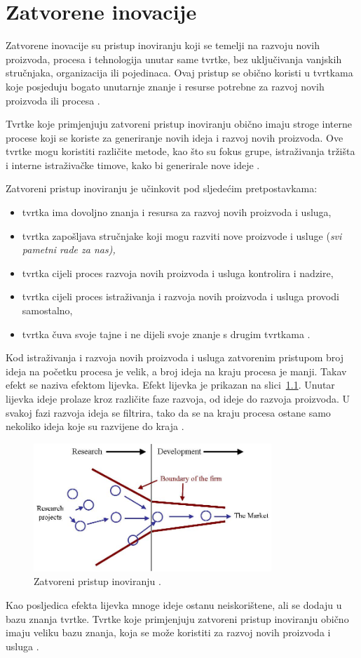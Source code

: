 \chapter{Zatvorene inovacije}

Zatvorene inovacije su pristup inoviranju koji se temelji na razvoju novih
proizvoda, procesa i tehnologija unutar same tvrtke, bez uključivanja vanjskih
stručnjaka, organizacija ili pojedinaca. Ovaj pristup se obično koristi u
tvrtkama koje posjeduju bogato unutarnje znanje i resurse potrebne za razvoj
novih proizvoda ili procesa \citep{zatvorenaotvorena2020}.

Tvrtke koje primjenjuju zatvoreni pristup inoviranju obično imaju stroge interne
procese koji se koriste za generiranje novih ideja i razvoj novih proizvoda. Ove
tvrtke mogu koristiti različite metode, kao što su fokus grupe, istraživanja
tržišta i interne istraživačke timove, kako bi generirale nove ideje \citep{zatvorenaotvorena2020}.

Zatvoreni pristup inoviranju je učinkovit pod sljedećim pretpostavkama:
\begin{itemize}
    \item tvrtka ima dovoljno znanja i resursa za razvoj novih proizvoda i usluga,
    \item tvrtka zapošljava stručnjake koji mogu razviti nove proizvode i usluge (\it{svi pametni rade za nas}),
    \item tvrtka cijeli proces razvoja novih proizvoda i usluga kontrolira i nadzire,
    \item tvrtka cijeli proces istraživanja i razvoja novih proizvoda i usluga provodi samostalno,
    \item tvrtka čuva svoje tajne i ne dijeli svoje znanje s drugim tvrtkama \citep{zatvorenaotvorena2020}.
\end{itemize}

Kod istraživanja i razvoja novih proizvoda i usluga zatvorenim pristupom broj ideja
na početku procesa je velik, a broj ideja na kraju procesa je manji. Takav efekt
se naziva efektom lijevka. Efekt lijevka je prikazan na slici~\ref{fig:closed_inovations_funnel}.
Unutar lijevka ideje prolaze kroz različite faze razvoja, od ideje do
razvoja proizvoda. U svakoj fazi razvoja ideja se filtrira, tako da se na kraju
procesa ostane samo nekoliko ideja koje su razvijene do kraja \citep{zatvorenaotvorena2020}.

\begin{figure} 
    \centering
    \includegraphics[width=0.8\textwidth]{images/closed_inovations_funnel.jpg}
    \caption{Zatvoreni pristup inoviranju \citep{openinnovation2016}.}\label{fig:closed_inovations_funnel}
\end{figure}

Kao posljedica efekta lijevka mnoge ideje ostanu neiskorištene, ali se dodaju
u bazu znanja tvrtke. Tvrtke koje primjenjuju zatvoreni pristup inoviranju
obično imaju veliku bazu znanja, koja se može koristiti za razvoj novih
proizvoda i usluga \citep{zatvorenaotvorena2020}.
